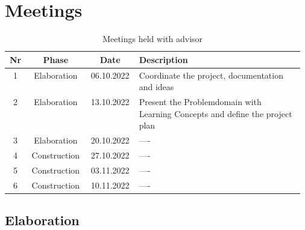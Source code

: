 \chapter{Meetings}

\begin{table}[H]
    \centering
    \begin{tabular}{| c | c | c | p{0.57\linewidth} |}
        \hline 
        Nr & Phase & Date & Description \\
        \hline \hline
        1 & Elaboration & 06.10.2022 & Coordinate the project, documentation \- and ideas \\
        \hline
        2 & Elaboration & 13.10.2022 & Present the Problemdomain with Learning Concepts and define the project plan \\
        \hline
        3 & Elaboration & 20.10.2022 & ---- \\
        \hline
        4 & Construction & 27.10.2022 & ---- \\
        \hline
        5 & Construction & 03.11.2022 & ---- \\
        \hline
        6 & Construction & 10.11.2022 & ---- \\
        \hline
    \end{tabular}
    \caption{Meetings held with advisor}
    \label{meetings_hold_table}
\end{table}
\section{Elaboration}
